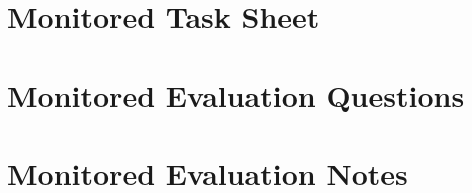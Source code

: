 \documentclass{l4proj}
\begin{document}
\begin{appendices}
% 
% 
% 
% 
% 


% 
\section{Monitored Task Sheet}
\label{section:monitored-tasks}

\section{Monitored Evaluation Questions}
\label{section:mon-questions}

% 
\section{Monitored Evaluation Notes}
\label{section:monitored-eval-notes}


\end{appendices}






\end{document}
